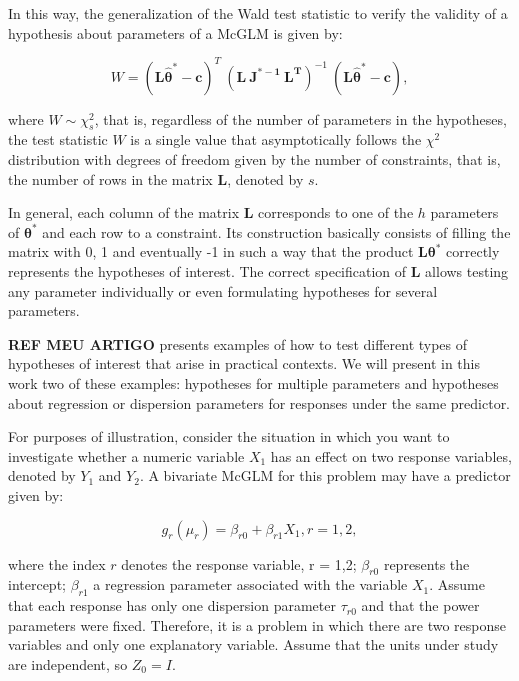 \documentclass[article]{jss}\usepackage[]{graphicx}\usepackage[]{xcolor}
\begin{document}
\noindent In this way, the generalization of the Wald test statistic to verify the validity of a hypothesis about parameters of a McGLM is given by:

$$
W = (\boldsymbol{L\hat\theta^{*}} - \boldsymbol{c})^T \ (\boldsymbol{L \ J^{\boldsymbol{*}-1} \ L^T})^{-1} \ (\boldsymbol{L\hat\theta^{*}} - \boldsymbol{c}),
$$

\noindent where $W \sim \chi^2_s$, that is, regardless of the number of parameters in the hypotheses, the test statistic $W$ is a single value that asymptotically follows the $\chi^2$ distribution with degrees of freedom given by the number of constraints, that is, the number of rows in the matrix $\boldsymbol{L}$, denoted by $s$.

In general, each column of the matrix $\boldsymbol{L}$ corresponds to one of the $h$ parameters of $\boldsymbol{\theta^{*}}$ and each row to a constraint. Its construction basically consists of filling the matrix with 0, 1 and eventually -1 in such a way that the product $\boldsymbol{L}\boldsymbol{\theta^{*}}$ correctly represents the hypotheses of interest. The correct specification of $\boldsymbol{L}$ allows testing any parameter individually or even formulating hypotheses for several parameters.

\textbf{REF MEU ARTIGO} presents examples of how to test different types of hypotheses of interest that arise in practical contexts. We will present in this work two of these examples: hypotheses for multiple parameters and hypotheses about regression or dispersion parameters for responses under the same predictor.

For purposes of illustration, consider the situation in which you want to investigate whether a numeric variable $X_1$ has an effect on two response variables, denoted by $Y_1$ and $Y_2$. A bivariate McGLM for this problem may have a predictor given by:

\begin{equation}
\label{eq:pred_ex}
g_r(\mu_r) = \beta_{r0} + \beta_{r1} X_1, r=1,2,
\end{equation}

\noindent where the index $r$ denotes the response variable, r = 1,2; $\beta_{r0}$ represents the intercept; $\beta_{r1}$ a regression parameter associated with the variable $X_1$. Assume that each response has only one dispersion parameter $\tau_{r0}$ and that the power parameters were fixed. Therefore, it is a problem in which there are two response variables and only one explanatory variable. Assume that the units under study are independent, so $Z_0 = I$. 
\end{document}
